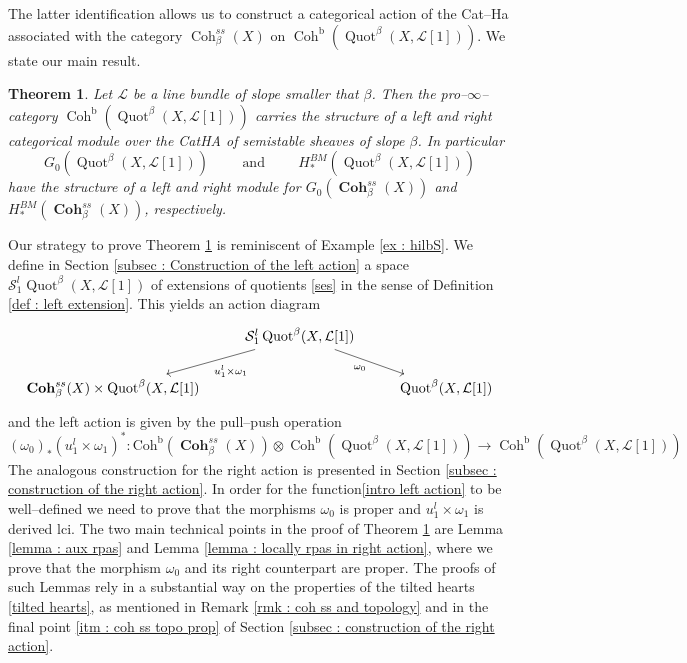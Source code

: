 \documentclass[11pt]{article}
\newtheorem{theorem}{Theorem}
\newcommand{\segal}{\mathcal{S}}
\newcommand{\coh}{\operatorname{Coh}}
\newcommand{\cohbetass}{\operatorname{Coh}^{ss}_{\beta}(X)}
\newcommand{\cohbetassstack}{\boldsymbol{\operatorname{Coh}}^{ss}_{\beta}(X)}
\newcommand{\linebundle}{\mathcal{L}}
\newcommand{\Quotbetaone}{\operatorname{Quot}^{\beta}(X,\mathcal{L}[1])}
\begin{document}
\noindent  The latter identification allows us to construct a categorical action of the Cat--Ha associated with the category $\cohbetass$ on $\operatorname{Coh}^{\operatorname{b}}(\Quotbetaone)$. We state our main result.

\begin{theorem}\label{theo 2}
     Let $\linebundle$ be a line bundle of slope smaller that $\beta$. Then the pro--$\infty$--category  \newline
\noindent$\operatorname{Coh}^{\operatorname{b}}(\Quotbetaone)$ carries the structure of a left and right categorical module over the CatHA of semistable sheaves of slope $\beta$. In particular 
      \[
            G_0(\Quotbetaone) \hspace{1cm} \text{and} \hspace{1cm} H_*^{BM}(\Quotbetaone)
       \]
       have the structure of a left and right module for $G_0(\cohbetassstack)$ and $H_*^{BM}(\cohbetassstack)$, respectively.
\end{theorem}

\noindent Our strategy to prove Theorem \ref{theo 2} is reminiscent of Example \ref{ex : hilbS}. We define in Section \ref{subsec : Construction of the left action} a space $\segal_1^l\Quotbetaone$ of extensions of quotients \eqref{ses} in the sense of Definition \ref{def : left extension}. This yields an action diagram 
\[
    \begin{tikzcd}
	& {\segal_1^l\Quotbetaone} & \\
	{\cohbetassstack \times \Quotbetaone} && \Quotbetaone 
	\arrow["{u^l_1 \times \omega_1}", from=1-2, to=2-1]
	\arrow["{\omega_0}"', from=1-2, to=2-3]
\end{tikzcd}
\]
and the left action is given by the pull--push operation
\begin{equation}\label{intro left action}
    (\omega_0)_*(u^l_1 \times \omega_1)^* \colon \operatorname{Coh^b}(\cohbetassstack) \otimes \coh^{\operatorname{b}}(\Quotbetaone) \longrightarrow \coh^{\operatorname{b}}(\Quotbetaone) 
\end{equation}
The analogous construction for the right action is presented in Section \ref{subsec : construction of the right action}. In order for the function\eqref{intro left action} to be well--defined we need to prove that the morphisms $\omega_0$ is proper and $u^l_1 \times \omega_1$ is derived lci. The two main technical points in the proof of Theorem \ref{theo 2} are Lemma \ref{lemma : aux rpas} and Lemma \ref{lemma : locally rpas in right action}, where we prove that the morphism $\omega_0$ and its right counterpart are proper. The proofs of such Lemmas rely in a substantial way on the properties of the tilted hearts \eqref{tilted hearts}, as mentioned in Remark \ref{rmk : coh ss and topology} and in the final point \ref{itm : coh ss topo prop} of Section \ref{subsec : construction of the right action}.
\end{document}
